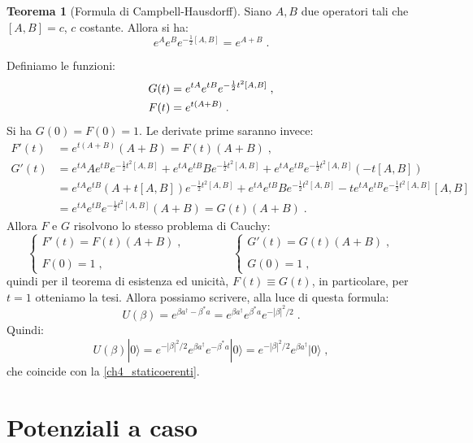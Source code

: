 \documentclass[10pt,a4paper]{report}
\theoremstyle{definition}
\newtheorem{thm}{Teorema}[section]
\numberwithin{equation}{section}
\newcommand{\ket}{\rangle}
\newcommand{\adj}[1]{#1^{\dagger}}
\begin{document}
\begin{thm}[Formula di Campbell-Hausdorff]
Siano $A,B$ due operatori tali che $[A,B]=c$, $c$ costante. Allora si ha:
\begin{equation}
e^Ae^Be^{-\frac{1}{2}[A,B]}=e^{A+B}\;.
\end{equation}
\end{thm}
\proof
Definiamo le funzioni:
\begin{align}
G(t) &= e^{tA}e^{tB}e^{-\frac{1}{2}t^2[A,B]}\;, \notag \\
F(t) &= e^{t(A+B)}\;.
\end{align}
Si ha $G(0)=F(0)=1$. Le derivate prime saranno invece:
\begin{align*}
F'(t)&=e^{t(A+B)}(A+B)=F(t)(A+B)\;, \\
G'(t)&= e^{tA}Ae^{tB}e^{-\frac{1}{2}t^2[A,B]}+e^{tA}e^{tB}Be^{-\frac{1}{2}t^2[A,B]}+e^{tA}e^{tB}e^{-\frac{1}{2}t^2[A,B]}(-t[A,B]) \\
&= e^{tA}e^{tB}(A+t[A,B])e^{-\frac{1}{2}t^2[A,B]}+e^{tA}e^{tB}Be^{-\frac{1}{2}t^2[A,B]}-te^{tA}e^{tB}e^{-\frac{1}{2}t^2[A,B]}[A,B] \\
&= e^{tA}e^{tB}e^{-\frac{1}{2}t^2[A,B]}(A+B)=G(t)(A+B)\;.
\end{align*}
Allora $F$ e $G$ risolvono lo stesso problema di Cauchy:
$$
\begin{cases}
F'(t)=F(t)(A+B)\;, \\
\\
F(0)=1\;,
\end{cases} \qquad\qquad
\begin{cases}
G'(t)=G(t)(A+B)\;, \\
\\
G(0)=1\;,
\end{cases}
$$
quindi per il teorema di esistenza ed unicità, $F(t)\equiv G(t)$, in particolare, per $t=1$ otteniamo la tesi.
\endproof
Allora possiamo scrivere, alla luce di questa formula:
\begin{equation}
U(\beta)=e^{\beta\adj{a}-\beta^*a}=e^{\beta\adj{a}}e^{\beta^*a}e^{-|\beta|^2/2}\;.
\end{equation}
Quindi:
\begin{equation}
U(\beta)|0\ket=e^{-|\beta|^2/2}e^{\beta\adj{a}}e^{-\beta^*a}|0\ket=e^{-|\beta|^2/2}e^{\beta\adj{a}}|0\ket\;,
\end{equation}
che coincide con la \eqref{ch4_staticoerenti}.
\chapter{Potenziali a caso}
\end{document}
